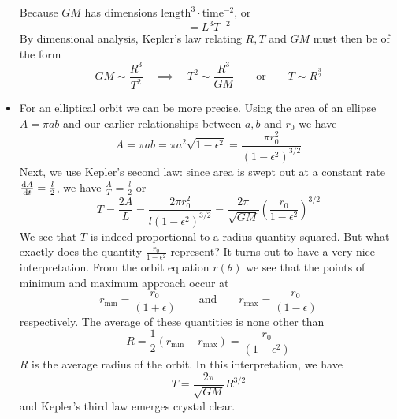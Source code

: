\documentclass[11pt, a4paper]{article}
\newcommand{\eqtext}[1]{\qquad \text{#1} \qquad}
\begin{document}
\begin{itemize}
	Because $ GM $ has dimensions $ \text{length}^{3} \cdot \text{time}^{-2} $, or
	\begin{equation*}
		[GM] = L^{3} T^{-2}
	\end{equation*}
	By dimensional analysis, Kepler's law relating $ R, T $ and $ GM $ must then be of the form
	\begin{equation*}
		GM \sim \frac{R^{3}}{T^{2}} \quad \implies \quad T^{2} \sim \frac{R^{3}}{GM} \eqtext{or} T \sim R^{\frac{3}{2}}
	\end{equation*}
	
	\item For an elliptical orbit we can be more precise. Using the area of an ellipse $ A = \pi a b $ and our earlier relationships between $ a, b $ and $ r_{0} $ we have
	\begin{equation*}
		A = \pi a b = \pi a^{2} \sqrt{1 - \epsilon^{2}} = \frac{\pi r_{0}^{2}}{(1 - \epsilon^{2})^{3/2}}
	\end{equation*}
	Next, we use Kepler's second law: since area is swept out at a constant rate $ \dv{A}{t} = \frac{l}{2} $, we have $ \frac{A}{T} = \frac{l}{2} $ or
	\begin{equation*}
		T = \frac{2A}{L} = \frac{2\pi r_{0}^{2}}{l(1 - \epsilon^{2})^{3/2}} = \frac{2\pi}{\sqrt{GM}} \left(\frac{r_{0}}{1-\epsilon^{2}}\right)^{3/2}
	\end{equation*}
	We see that $ T $ is indeed proportional to a radius quantity squared. But what exactly does the quantity $  \frac{r_{0}}{1-\epsilon^{2}}$ represent? It turns out to have a very nice interpretation. From the orbit equation $ r(\theta) $ we see that the points of minimum and maximum approach occur at
	\begin{equation*}
		r_{\text{min}} = \frac{r_{0}}{(1 + \epsilon)} \eqtext{and} r_{\text{max}} = \frac{r_{0}}{(1 - \epsilon)}
	\end{equation*}
	respectively. The average of these quantities is none other than
	\begin{equation*}
		R = \frac{1}{2}(r_{\text{min}} + r_{\text{max}}) = \frac{r_{0}}{(1-\epsilon^{2})}
	\end{equation*}
	$ R $ is the average radius of the orbit. In this interpretation, we have
	\begin{equation*}
		T = \frac{2\pi}{\sqrt{GM}} R^{3/2}
	\end{equation*}
	and Kepler's third law emerges crystal clear.
	
	
\end{itemize}
\end{document}
